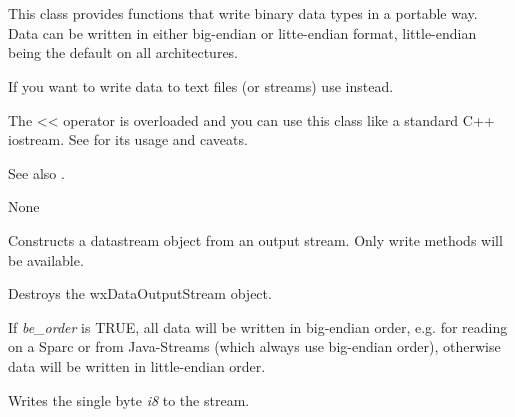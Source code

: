 \section{}\label{wxdataoutputstream}

This class provides functions that write binary data types in a
portable way. Data can be written in either big-endian or litte-endian
format, little-endian being the default on all architectures.

If you want to write data to text files (or streams) use 
 instead.

The << operator is overloaded and you can use this class like a standard 
C++ iostream. See  for its 
usage and caveats.

See also . 


None


\label{wxdataoutputstreamconstr}


Constructs a datastream object from an output stream. Only write methods will
be available.





Destroys the wxDataOutputStream object.



If {\it be\_order} is TRUE, all data will be written in big-endian
order, e.g. for reading on a Sparc or from Java-Streams (which
always use big-endian order), otherwise data will be written in
little-endian order.
 


Writes the single byte {\it i8} to the stream.

